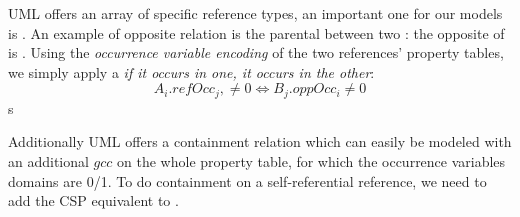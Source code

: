 

UML offers an array of specific reference types, an important one for our models is .
An example of opposite relation is the parental between two : the opposite of  is .
Using the \textit{occurrence variable encoding} of the two references' property tables, we simply apply a \textit{if it occurs in one, it occurs in the other}:  
$$A_i.refOcc_{j},\neq 0 \iff B_j.oppOcc_{i}\neq 0$$s

Additionally UML offers a containment relation which can easily be modeled with an additional $gcc$ on the whole property table, for which the occurrence variables domains are 0/1.
To do containment on a self-referential reference, we need to add the CSP equivalent to .